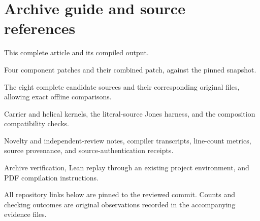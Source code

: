 \documentclass[11pt,letterpaper]{article}
\newcommand{\code}[1]{\nolinkurl{#1}}
\begin{document}
\section{Archive guide and source references}

\begin{description}[style=nextline]
\item[\code{report.tex}, \code{report.pdf}] This complete article and its compiled output.
\item[\code{patches/}] Four component patches and their combined patch, against the pinned snapshot.
\item[\code{replacements/}, \code{baseline/}] The eight complete candidate sources and their corresponding original files, allowing exact offline comparisons.
\item[\code{lean/}] Carrier and helical kernels, the literal-source Jones harness, and the composition compatibility checks.
\item[\code{evidence/}] Novelty and independent-review notes, compiler transcripts, line-count metrics, source provenance, and source-authentication receipts.
\item[\code{scripts/}] Archive verification, Lean replay through an existing project environment, and PDF compilation instructions.
\end{description}

All repository links below are pinned to the reviewed commit. Counts and checking outcomes are original observations recorded in the accompanying evidence files.
\end{document}
